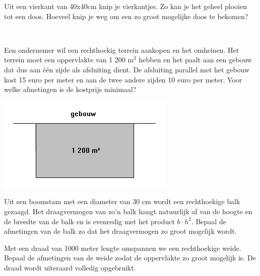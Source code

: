 \documentclass[12pt]{article}
\begin{document}
\begin{oefening}
  Uit een vierkant van 40x40cm knip je vierkantjes. Zo kan je het geheel plooien tot een doos.
  Hoeveel knip je weg om een zo groot mogelijke doos te bekomen?
\end{oefening}

\begin{oefening}\\
  \begin{minipage}{0.6\textwidth}
    Een ondernemer wil een rechthoekig terrein aankopen en het omheinen. Het terrein
    moet een oppervlakte van 1 200 m$^2$ hebben en het paalt aan een gebouw dat dus aan
    één zijde als afsluiting dient. De afsluiting parallel met het gebouw kost 15 euro per meter
    en aan de twee andere zijden 10 euro per meter. Voor welke afmetingen is de kostprijs
    minimaal?
  \end{minipage}
  \begin{minipage}{0.4\textwidth}
    \centering
    \includegraphics[width=\textwidth]{terrein-omheinen}
  \end{minipage}
\end{oefening}

\begin{oefening}
  Uit een boomstam met een diameter van 30 cm wordt een rechthoekige balk gezaagd.
  Het draagvermogen van zo'n balk hangt natuurlijk af van de hoogte en de breedte van de balk
  en is evenredig met het product $b\cdot h^2$.
  Bepaal de afmetingen van de balk zo dat het draagvermogen zo groot mogelijk wordt.
\end{oefening}

\begin{oefening}
  Met een draad van 1000 meter lengte omspannen we een rechthoekige weide. Bepaal de afmetingen van de weide zodat de oppervlakte zo groot mogelijk is. De draad wordt uiteraard volledig opgebruikt.
\end{oefening}
\end{document}

